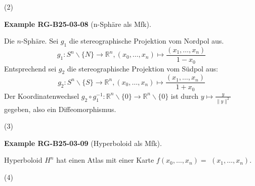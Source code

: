\documentclass[10pt, letterpaper]{article}
\newcommand{\CustomHeading}[3]{%
  \par\medskip\noindent%
  \textbf{#1 #2} \textnormal{(#3)}.\enskip%
}
\newenvironment{EXA}[2]{\begin{unitbox}\CustomHeading{Example}{#1}{#2}}{\end{unitbox}}
\begin{document}
(2) 

\begin{EXA}{RG-B25-03-08}{n-Sphäre als Mfk}
Die $n$-Sphäre. Sei $g_{1}$ die stereographische Projektion vom Nordpol aus.
$$
g_{1}: S^{n} \backslash\{N\} \rightarrow \mathbb{R}^{n},\left(x_{0}, \ldots, x_{n}\right) \mapsto \frac{\left(x_{1}, \ldots, x_{n}\right)}{1-x_{0}}
$$
Entsprechend sei $g_{2}$ die stereographische Projektion vom Südpol aus:
$$
g_{2}: S^{n} \backslash\{S\} \rightarrow \mathbb{R}^{n},\left(x_{0}, \ldots, x_{n}\right) \mapsto \frac{\left(x_{1}, \ldots, x_{n}\right)}{1+x_{0}}
$$
Der Koordinatenwechsel $g_{2} \circ g_{1}^{-1}: \mathbb{R}^{n} \backslash\{0\} \rightarrow \mathbb{R}^{n} \backslash\{0\}$ ist durch $y \mapsto \frac{y}{\|y\|^{2}}$ gegeben, also ein Diffeomorphismus.
\end{EXA}


(3) 

\begin{EXA}{RG-B25-03-09}{Hyperboloid als Mfk}
Hyperboloid $H^{n}$ hat einen Atlas mit einer Karte $f\left(x_{0}, \ldots, x_{n}\right)=$ $\left(x_{1}, \ldots, x_{n}\right)$.
\end{EXA}


(4) 
\end{document}
